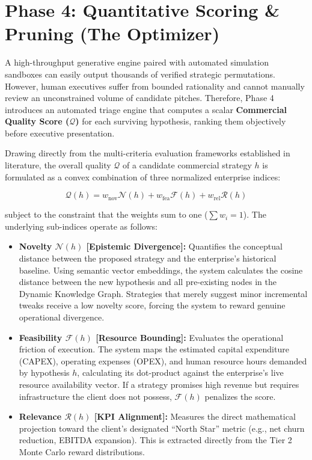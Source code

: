 \documentclass[11pt, a4paper]{article}
\begin{document}
\section{Phase 4: Quantitative Scoring \& Pruning (The Optimizer)}

A high-throughput generative engine paired with automated simulation sandboxes can easily output thousands of verified strategic permutations. However, human executives suffer from bounded rationality and cannot manually review an unconstrained volume of candidate pitches. Therefore, Phase 4 introduces an automated triage engine that computes a scalar \textbf{Commercial Quality Score ($\mathcal{Q}$)} for each surviving hypothesis, ranking them objectively before executive presentation.

Drawing directly from the multi-criteria evaluation frameworks established in literature, the overall quality $\mathcal{Q}$ of a candidate commercial strategy $h$ is formulated as a convex combination of three normalized enterprise indices:

\[
\mathcal{Q}(h) = w_{\text{nov}}\mathcal{N}(h) + w_{\text{fea}}\mathcal{F}(h) + w_{\text{rel}}\mathcal{R}(h)
\]

subject to the constraint that the weights sum to one ($\sum w_i = 1$). The underlying sub-indices operate as follows:

\begin{itemize}[leftmargin=*]
    \item \textbf{Novelty $\mathcal{N}(h)$ [Epistemic Divergence]:} Quantifies the conceptual distance between the proposed strategy and the enterprise’s historical baseline. Using semantic vector embeddings, the system calculates the cosine distance between the new hypothesis and all pre-existing nodes in the Dynamic Knowledge Graph. Strategies that merely suggest minor incremental tweaks receive a low novelty score, forcing the system to reward genuine operational divergence.
    
    \item \textbf{Feasibility $\mathcal{F}(h)$ [Resource Bounding]:} Evaluates the operational friction of execution. The system maps the estimated capital expenditure (CAPEX), operating expenses (OPEX), and human resource hours demanded by hypothesis $h$, calculating its dot-product against the enterprise's live resource availability vector. If a strategy promises high revenue but requires infrastructure the client does not possess, $\mathcal{F}(h)$ penalizes the score.
    
    \item \textbf{Relevance $\mathcal{R}(h)$ [KPI Alignment]:} Measures the direct mathematical projection toward the client’s designated ``North Star'' metric (e.g., net churn reduction, EBITDA expansion). This is extracted directly from the Tier 2 Monte Carlo reward distributions.
\end{itemize}
\end{document}
